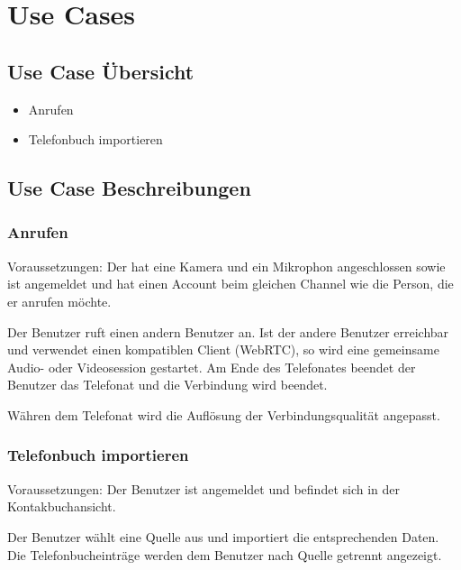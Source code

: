 \section{Use Cases}

	\subsection{Use Case Übersicht}
	\begin{itemize}
		\item Anrufen
		\item Telefonbuch importieren
	\end{itemize}

	\subsection{Use Case Beschreibungen}

		\subsubsection{Anrufen}
		Voraussetzungen: Der hat eine Kamera und ein Mikrophon angeschlossen sowie ist angemeldet und hat einen Account beim gleichen Channel wie die Person, die er anrufen möchte.\newline

		Der Benutzer ruft einen andern Benutzer an. Ist der andere Benutzer erreichbar
		und verwendet einen kompatiblen Client (WebRTC), so wird eine gemeinsame Audio- oder Videosession gestartet.
		Am Ende des Telefonates beendet der Benutzer das Telefonat und die Verbindung wird beendet.

		Währen dem Telefonat wird die Auflösung der Verbindungsqualität angepasst.

		\subsubsection{Telefonbuch importieren}
		Voraussetzungen: Der Benutzer ist angemeldet und befindet sich in der Kontakbuchansicht.\newline
		
		Der Benutzer wählt eine Quelle aus und importiert die entsprechenden Daten. Die Telefonbucheinträge werden dem Benutzer nach Quelle getrennt angezeigt.
